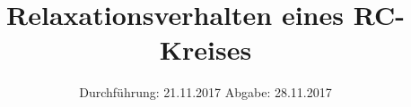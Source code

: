 

\subject{Versuch 353}
\title{Relaxationsverhalten eines RC-Kreises}
\date{
  Durchführung: 21.11.2017
  \hspace{3em}
  Abgabe: 28.11.2017
}



\maketitle
\thispagestyle{empty}
\tableofcontents
\newpage








\printbibliography{}


